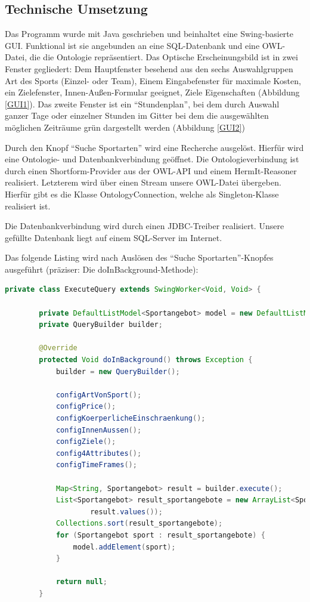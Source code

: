 \subsection{Technische Umsetzung}

Das Programm wurde mit Java geschrieben und beinhaltet eine Swing-basierte GUI. Funktional ist sie angebunden an eine SQL-Datenbank und eine OWL-Datei, die die Ontologie repräsentiert. Das Optische Erscheinungsbild ist in zwei Fenster gegliedert: Dem Hauptfenster besehend aus den sechs Auswahlgruppen Art des Sports (Einzel- oder Team), Einem Eingabefenster für maximale Kosten, ein Zielefenster, Innen-Außen-Formular geeignet, Ziele Eigenschaften (Abbildung \ref{GUI1}). Das zweite Fenster ist ein "`Stundenplan"', bei dem durch Auswahl ganzer Tage oder einzelner Stunden im Gitter bei dem die ausgewählten möglichen Zeiträume grün dargestellt werden (Abbildung \ref{GUI2})



Durch den Knopf "`Suche Sportarten"' wird eine Recherche ausgelöst. Hierfür wird eine Ontologie- und Datenbankverbindung geöffnet.
Die Ontologieverbindung ist durch einen Shortform-Provider aus der OWL-API und einem HermIt-Reasoner realisiert. Letzterem wird über einen Stream unsere OWL-Datei übergeben. Hierfür gibt es die Klasse OntologyConnection, welche als Singleton-Klasse realisiert ist.

Die Datenbankverbindung wird durch einen JDBC-Treiber realisiert. Unsere gefüllte Datenbank liegt auf einem SQL-Server im Internet.

Das folgende Listing wird nach Auslösen des "`Suche Sportarten"'-Knopfes ausgeführt (präziser: Die doInBackground-Methode):


\begin{lstlisting}[language=JAVA]
	private class ExecuteQuery extends SwingWorker<Void, Void> {

		private DefaultListModel<Sportangebot> model = new DefaultListModel<Sportangebot>();
		private QueryBuilder builder;

		@Override
		protected Void doInBackground() throws Exception {
			builder = new QueryBuilder();

			configArtVonSport();
			configPrice();
			configKoerperlicheEinschraenkung();
			configInnenAussen();
			configZiele();
			config4Attributes();
			configTimeFrames();

			Map<String, Sportangebot> result = builder.execute();
			List<Sportangebot> result_sportangebote = new ArrayList<Sportangebot>(
					result.values());
			Collections.sort(result_sportangebote);
			for (Sportangebot sport : result_sportangebote) {
				model.addElement(sport);
			}

			return null;
		}
\end{lstlisting}

